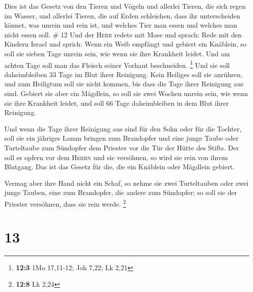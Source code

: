  Dies ist das Gesetz von den Tieren und Vögeln und
allerlei Tieren, die sich regen im Wasser, und allerlei Tieren, die auf
Erden schleichen,  dass ihr unterscheiden könnet, was
unrein und rein ist, und welches Tier man essen und welches man nicht
essen soll. \# 12  Und der \textsc{Herr} redete mit Mose
und sprach:  Rede mit den Kindern Israel und sprich: Wenn
ein Weib empfängt und gebiert ein Knäblein, so soll sie sieben Tage
unrein sein, wie wenn sie ihre Krankheit leidet.  Und am
achten Tage soll man das Fleisch seiner Vorhaut beschneiden. \footnote{\textbf{12:3}
  1Mo 17,11-12; Joh 7,22; Lk 2,21}  Und sie soll
daheimbleiben 33 Tage im Blut ihrer Reinigung. Kein Heiliges soll sie
anrühren, und zum Heiligtum soll sie nicht kommen, bis dass die Tage
ihrer Reinigung aus sind.  Gebiert sie aber ein Mägdlein,
so soll sie zwei Wochen unrein sein, wie wenn sie ihre Krankheit leidet,
und soll 66 Tage daheimbleiben in dem Blut ihrer Reinigung.

 Und wenn die Tage ihrer Reinigung aus sind für den Sohn
oder für die Tochter, soll sie ein jähriges Lamm bringen zum Brandopfer
und eine junge Taube oder Turteltaube zum Sündopfer dem Priester vor die
Tür der Hütte des Stifts.  Der soll es opfern vor dem
\textsc{Herrn} und sie versöhnen, so wird sie rein von ihrem Blutgang.
Das ist das Gesetz für die, die ein Knäblein oder Mägdlein gebiert.

 Vermag aber ihre Hand nicht ein Schaf, so nehme sie zwei
Turteltauben oder zwei junge Tauben, eine zum Brandopfer, die andere zum
Sündopfer; so soll sie der Priester versöhnen, dass sie rein werde.
\footnote{\textbf{12:8} Lk 2,24}

\hypertarget{section-3}{%
\section{13}\label{section-3}}

